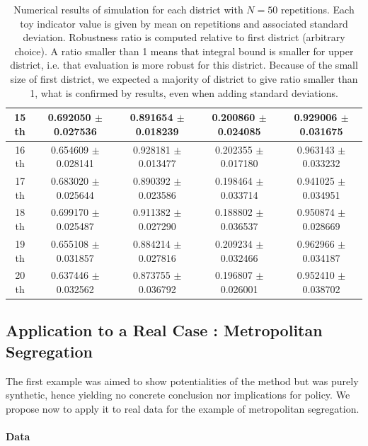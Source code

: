 \documentclass[runningheads,a4paper]{llncs2e/llncs}
\begin{document}
\begin{table}[h!]
\begin{tabular}[6pt]{c|c|c|c|c}
\hline
15 th & 0.692050 $\pm$ 0.027536 & 0.891654 $\pm$ 0.018239 & 0.200860 $\pm$ 0.024085 & 0.929006 $\pm$ 0.031675\\[3pt]
\hline
16 th & 0.654609 $\pm$ 0.028141 & 0.928181 $\pm$ 0.013477 & 0.202355 $\pm$ 0.017180 & 0.963143 $\pm$ 0.033232\\[3pt]
\hline
17 th & 0.683020 $\pm$ 0.025644 & 0.890392 $\pm$ 0.023586 & 0.198464 $\pm$ 0.033714 & 0.941025 $\pm$ 0.034951\\[3pt]
\hline
18 th & 0.699170 $\pm$ 0.025487 & 0.911382 $\pm$ 0.027290 & 0.188802 $\pm$ 0.036537 & 0.950874 $\pm$ 0.028669\\[3pt]
\hline
19 th & 0.655108 $\pm$ 0.031857 & 0.884214 $\pm$ 0.027816 & 0.209234 $\pm$ 0.032466 & 0.962966 $\pm$ 0.034187\\[3pt]
\hline
20 th & 0.637446 $\pm$ 0.032562 & 0.873755 $\pm$ 0.036792 & 0.196807 $\pm$ 0.026001 & 0.952410 $\pm$ 0.038702\\[3pt]
\hline
\end{tabular}

\bigskip

\caption{Numerical results of simulation for each district with $N=50$ repetitions. Each toy indicator value is given by mean on repetitions and associated standard deviation. Robustness ratio is computed relative to first district (arbitrary choice). A ratio smaller than 1 means that integral bound is smaller for upper district, i.e. that evaluation is more robust for this district. Because of the small size of first district, we expected a majority of district to give ratio smaller than 1, what is confirmed by results, even when adding standard deviations.}


\end{table}




\subsection{Application to a Real Case : Metropolitan Segregation}

The first example was aimed to show potentialities of the method but was purely synthetic, hence yielding no concrete conclusion nor implications for policy. We propose now to apply it to real data for the example of metropolitan segregation.

\paragraph{Data}
\end{document}
